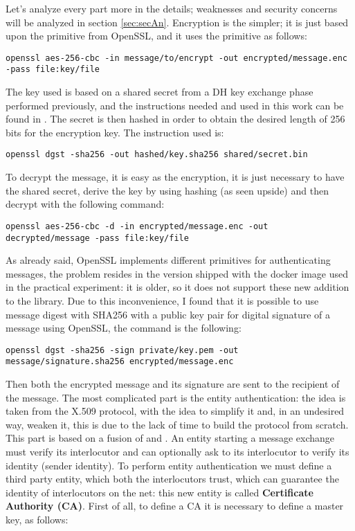 \documentclass{article}
\begin{document}
Let's analyze every part more in the details; weaknesses and security concerns will be analyzed in section \ref{sec:secAn}.\newline
Encryption is the simpler; it is just based upon the primitive from OpenSSL, and it uses the primitive as follows: 

\begin{lstlisting}[breaklines]
	openssl aes-256-cbc -in message/to/encrypt -out encrypted/message.enc -pass file:key/file
\end{lstlisting}

The key used is based on a shared secret from a DH key exchange phase performed previously, and the instructions needed and used in this work can be found in \cite{DHKE}. The secret is then hashed in order to obtain the desired length of 256 bits for the encryption key. The instruction used is:

\begin{lstlisting}[breaklines]
	openssl dgst -sha256 -out hashed/key.sha256 shared/secret.bin
\end{lstlisting}

To decrypt the message, it is easy as the encryption, it is just necessary to have the shared secret, derive the key by using hashing (as seen upside) and then decrypt with the following command:

\begin{lstlisting}[breaklines]
	openssl aes-256-cbc -d -in encrypted/message.enc -out decrypted/message -pass file:key/file
\end{lstlisting}

As already said, OpenSSL implements different primitives for authenticating messages, the problem resides in the version shipped with the docker image used in the practical experiment: it is older, so it does not support these new addition to the library. Due to this inconvenience, I found \cite{signatures} that it is possible to use message digest with SHA256 with a public key pair for digital signature of a message using OpenSSL, the command is the following:

\begin{lstlisting}[breaklines]
	openssl dgst -sha256 -sign private/key.pem -out message/signature.sha256 encrypted/message.enc
\end{lstlisting}

Then both the encrypted message and its signature are sent to the recipient of the message. \newline
The most complicated part is the entity authentication: the idea is taken from the X.509 protocol, with the idea to simplify it and, in an undesired way, weaken it, this is due to the lack of time to build the protocol from scratch. This part is based on a fusion of \cite{certificates1} and \cite{certificates2}. An entity starting a message exchange must verify its interlocutor and can optionally ask to its interlocutor to verify its identity (sender identity). To perform entity authentication we must define a third party entity, which both the interlocutors trust, which can guarantee the identity of interlocutors on the net: this new entity is called \textbf{Certificate Authority (CA)}. First of all, to define a CA it is necessary to define a master key, as follows: 
\end{document}

